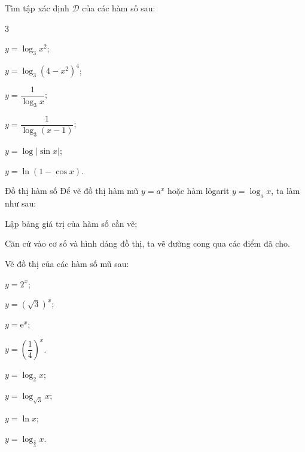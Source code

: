 \begin{vd}%
	Tìm tập xác định $\mathscr{D}$ của các hàm số sau:
	\begin{enumEX}[a)]{3}
		\item $y = \log_{3}x^2 $;
		\item $y = \log_{3}\left(4-x^2 \right)^4$;
		\item $y = \dfrac{1}{\log_{3}x}$;
		\item $y = \dfrac{1}{\log_{3}(x-1)}$;
		\item $y = \log\left|\sin x\right|$;
		\item $y = \ln\left(1- \cos x \right)$.
	\end{enumEX}
	\loigiai{
	}
\end{vd} 

\begin{dang}{Đồ thị hàm số}
	Để vẽ đồ thị hàm mũ $y=a^x$ hoặc hàm lôgarit $y=\log_a x$, ta làm như sau:
	\begin{listEX}[1]
		\item [\ding{172}] Lập bảng giá trị của hàm số cần vẽ;
		\item [\ding{173}] Căn cứ vào cơ số và hình dáng đồ thị, ta vẽ đường cong qua các điểm đã cho.
	\end{listEX}
\end{dang}

\begin{vd}%
	Vẽ đồ thị của các hàm số mũ sau:
	\begin{listEX}[4]
		\item $y=2^x$;
		\item  $y=(\sqrt{3})^x$;
		\item $y=\mathrm{e}^x$;
		\item  $y=\left(\dfrac{1}{4}\right)^x$.	
		\item $y=\log_2 x$;
		\item  $y=\log_{\sqrt{3}}x$;
		\item $y=\ln x$;
		\item  $y=\log_{\frac{2}{3}}x$.	
	\end{listEX}
	\loigiai{
	}
\end{vd} 

